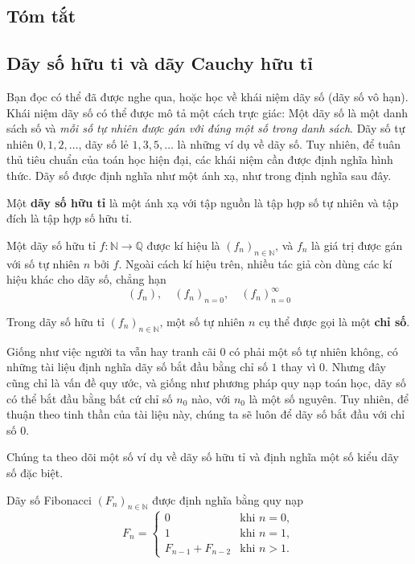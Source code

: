 \subsection{Tóm tắt}


\subsection{Dãy số hữu ti và dãy Cauchy hữu tỉ}

Bạn đọc có thể đã được nghe qua, hoặc học về khái niệm dãy số (dãy số vô hạn). Khái niệm dãy số có thể được mô tả một cách trực giác: Một dãy số là một danh sách số và \textit{mỗi số tự nhiên được gán với đúng một số trong danh sách}. Dãy số tự nhiên $0, 1, 2, \ldots$, dãy số lẻ $1, 3, 5, \ldots$ là những ví dụ về dãy số. Tuy nhiên, để tuân thủ tiêu chuẩn của toán học hiện đại, các khái niệm cần được định nghĩa hình thức. Dãy số được định nghĩa như một ánh xạ, như trong định nghĩa sau đây.

\begin{definition}
    Một \textbf{dãy số hữu tỉ} là một ánh xạ với tập nguồn là tập hợp số tự nhiên và tập đích là tập hợp số hữu tỉ.

    \noindent Một dãy số hữu tỉ $f: \mathbb{N}\to\mathbb{Q}$ được kí hiệu là ${(f_{n})}_{n\in\mathbb{N}}$, và $f_{n}$ là giá trị được gán với số tự nhiên $n$ bởi $f$. Ngoài cách kí hiệu trên, nhiều tác giả còn dùng các kí hiệu khác cho dãy số, chẳng hạn
    \[
        {(f_{n})}, \quad {(f_{n})}_{n=0}, \quad {(f_{n})}^{\infty}_{n=0}
    \]

    \noindent Trong dãy số hữu tỉ ${(f_{n})}_{n\in\mathbb{N}}$, một số tự nhiên $n$ cụ thể được gọi là một \textbf{chỉ số}.
\end{definition}

Giống như việc người ta vẫn hay tranh cãi $0$ có phải một số tự nhiên không, có những tài liệu định nghĩa dãy số bắt đầu bằng chỉ số $1$ thay vì $0$. Nhưng đây cũng chỉ là vấn đề quy ước, và giống như phương pháp quy nạp toán học, dãy số có thể bắt đầu bằng bất cứ chỉ số $n_{0}$ nào, với $n_{0}$ là một số nguyên. Tuy nhiên, để thuận theo tinh thần của tài liệu này, chúng ta sẽ luôn để dãy số bắt đầu với chỉ số $0$.

Chúng ta theo dõi một số ví dụ về dãy số hữu tỉ và định nghĩa một số kiểu dãy số đặc biệt.
\begin{example}
    Dãy số Fibonacci ${(F_{n})}_{n\in\mathbb{N}}$ được định nghĩa bằng quy nạp
    \[
        F_{n} = \begin{cases}
            0                 & \text{khi $n = 0$}, \\
            1                 & \text{khi $n = 1$}, \\
            F_{n-1} + F_{n-2} & \text{khi $n > 1$}.
        \end{cases}
    \]
\end{example}

